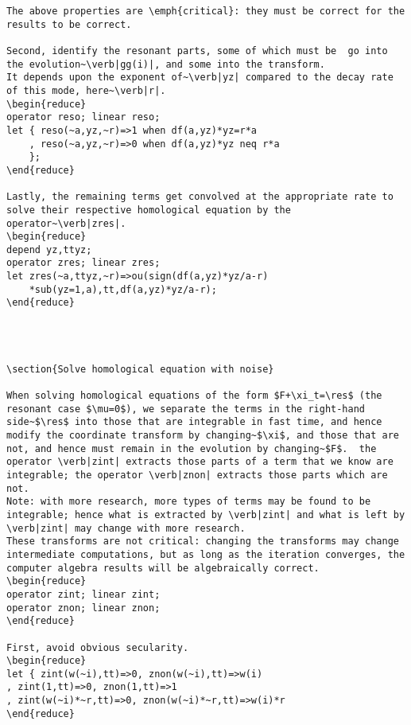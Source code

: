 \documentclass[11pt,a5paper]{article}
\newcommand{\res}{\operatorname{Res}}
\begin{document}
\begin{reduce}
\begin{verbatim}
The above properties are \emph{critical}: they must be correct for the results to be correct.

Second, identify the resonant parts, some of which must be  go into the evolution~\verb|gg(i)|, and some into the transform.
It depends upon the exponent of~\verb|yz| compared to the decay rate of this mode, here~\verb|r|.
\begin{reduce}
operator reso; linear reso;
let { reso(~a,yz,~r)=>1 when df(a,yz)*yz=r*a
    , reso(~a,yz,~r)=>0 when df(a,yz)*yz neq r*a
    };
\end{reduce}

Lastly, the remaining terms get convolved at the appropriate rate to solve their respective homological equation by the operator~\verb|zres|.
\begin{reduce}
depend yz,ttyz;
operator zres; linear zres;
let zres(~a,ttyz,~r)=>ou(sign(df(a,yz)*yz/a-r)
    *sub(yz=1,a),tt,df(a,yz)*yz/a-r);
\end{reduce}




\section{Solve homological equation with noise}

When solving homological equations of the form $F+\xi_t=\res$ (the resonant case $\mu=0$), we separate the terms in the right-hand side~$\res$ into those that are integrable in fast time, and hence modify the coordinate transform by changing~$\xi$, and those that are not, and hence must remain in the evolution by changing~$F$.  the operator \verb|zint| extracts those parts of a term that we know are integrable; the operator \verb|znon| extracts those parts which are not.
Note: with more research, more types of terms may be found to be integrable; hence what is extracted by \verb|zint| and what is left by \verb|zint| may change with more research.
These transforms are not critical: changing the transforms may change intermediate computations, but as long as the iteration converges, the computer algebra results will be algebraically correct.
\begin{reduce}
operator zint; linear zint;
operator znon; linear znon;
\end{reduce}

First, avoid obvious secularity.
\begin{reduce}
let { zint(w(~i),tt)=>0, znon(w(~i),tt)=>w(i)
, zint(1,tt)=>0, znon(1,tt)=>1
, zint(w(~i)*~r,tt)=>0, znon(w(~i)*~r,tt)=>w(i)*r
\end{reduce}


\end{verbatim}
\end{reduce}
\end{document}
